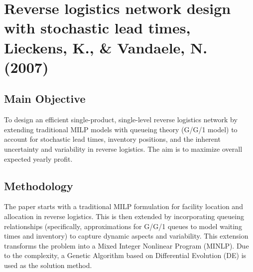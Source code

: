 
\section{{Reverse logistics network design with stochastic lead times, Lieckens, K., \& Vandaele, N. (2007)}}

\subsection*{Main Objective}
To design an efficient single-product, single-level reverse logistics network by extending traditional MILP models with queueing theory (G/G/1 model) to account for stochastic lead times, inventory positions, and the inherent uncertainty and variability in reverse logistics. The aim is to maximize overall expected yearly profit.

\subsection*{Methodology}
The paper starts with a traditional MILP formulation for facility location and allocation in reverse logistics. This is then extended by incorporating queueing relationships (specifically, approximations for G/G/1 queues to model waiting times and inventory) to capture dynamic aspects and variability. This extension transforms the problem into a Mixed Integer Nonlinear Program (MINLP). Due to the complexity, a Genetic Algorithm based on Differential Evolution (DE) is used as the solution method.

